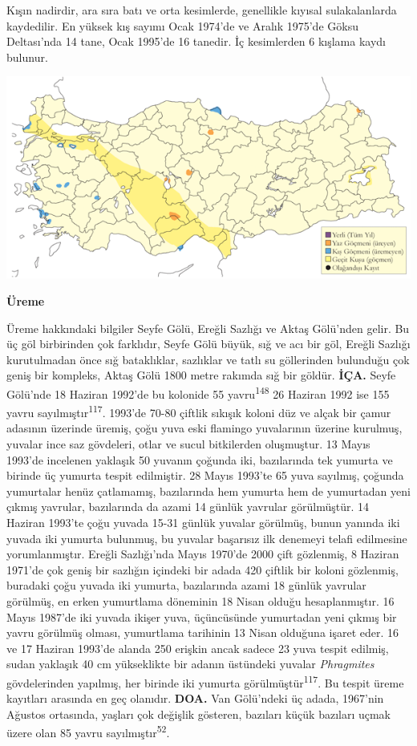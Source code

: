 \documentclass[
  letterpaper,
  DIV=11,
  numbers=noendperiod]{scrreprt}
\begin{document}
Kışın nadirdir, ara sıra batı ve orta kesimlerde, genellikle kıyısal
sulakalanlarda kaydedilir. En yüksek kış sayımı Ocak 1974'de ve Aralık
1975'de Göksu Deltası'nda 14 tane, Ocak 1995'de 16 tanedir. İç
kesimlerden 6 kışlama kaydı bulunur.

\includegraphics{images/harita_Page_073.png}

\textbf{Üreme}

Üreme hakkındaki bilgiler Seyfe Gölü, Ereğli Sazlığı ve Aktaş Gölü'nden
gelir. Bu üç göl birbirinden çok farklıdır, Seyfe Gölü büyük, sığ ve acı
bir göl, Ereğli Sazlığı kurutulmadan önce sığ bataklıklar, sazlıklar ve
tatlı su göllerinden bulunduğu çok geniş bir kompleks, Aktaş Gölü 1800
metre rakımda sığ bir göldür. \textbf{İÇA.} Seyfe Gölü'nde 18 Haziran
1992'de bu kolonide 55 yavru\textsuperscript{148} 26 Haziran 1992 ise
155 yavru sayılmıştır\textsuperscript{117}. 1993'de 70-80 çiftlik
sıkışık koloni düz ve alçak bir çamur adasının üzerinde üremiş, çoğu
yuva eski flamingo yuvalarının üzerine kurulmuş, yuvalar ince saz
gövdeleri, otlar ve sucul bitkilerden oluşmuştur. 13 Mayıs 1993'de
incelenen yaklaşık 50 yuvanın çoğunda iki, bazılarında tek yumurta ve
birinde üç yumurta tespit edilmiştir. 28 Mayıs 1993'te 65 yuva sayılmış,
çoğunda yumurtalar henüz çatlamamış, bazılarında hem yumurta hem de
yumurtadan yeni çıkmış yavrular, bazılarında da azami 14 günlük yavrular
görülmüştür. 14 Haziran 1993'te çoğu yuvada 15-31 günlük yuvalar
görülmüş, bunun yanında iki yuvada iki yumurta bulunmuş, bu yuvalar
başarısız ilk denemeyi telafi edilmesine yorumlanmıştır. Ereğli
Sazlığı'nda Mayıs 1970'de 2000 çift gözlenmiş, 8 Haziran 1971'de çok
geniş bir sazlığın içindeki bir adada 420 çiftlik bir koloni gözlenmiş,
buradaki çoğu yuvada iki yumurta, bazılarında azami 18 günlük yavrular
görülmüş, en erken yumurtlama döneminin 18 Nisan olduğu hesaplanmıştır.
16 Mayıs 1987'de iki yuvada ikişer yuva, üçüncüsünde yumurtadan yeni
çıkmış bir yavru görülmüş olması, yumurtlama tarihinin 13 Nisan olduğuna
işaret eder. 16 ve 17 Haziran 1993'de alanda 250 erişkin ancak sadece 23
yuva tespit edilmiş, sudan yaklaşık 40 cm yükseklikte bir adanın
üstündeki yuvalar \emph{Phragmites} gövdelerinden yapılmış, her birinde
iki yumurta görülmüştür\textsuperscript{117}. Bu tespit üreme kayıtları
arasında en geç olanıdır. \textbf{DOA.} Van Gölü'ndeki üç adada,
1967'nin Ağustos ortasında, yaşları çok değişlik gösteren, bazıları
küçük bazıları uçmak üzere olan 85 yavru
sayılmıştır\textsuperscript{52}.
\end{document}
